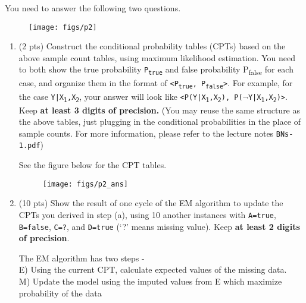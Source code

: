 \documentclass{article}
\newenvironment{soln}{
	\leavevmode\color{blue}\ignorespaces
}{}
\begin{document}
\begin{enumerate}
You need to answer the following two questions.


\begin{figure}[H]
\centering
\texttt{[image: figs/p2]}
\label{fig:q2}
\end{figure}

\begin{enumerate}
\item (2 pts) Construct the conditional probability tables (CPTs) based on the above sample count tables, using maximum likelihood estimation. You need to both show the true probability \texttt{P\textsubscript{true}} and false probability P\textsubscript{false} for each case, and organize them in the format of \texttt{<P\textsubscript{true}, P\textsubscript{false}>}. For example, for the case \texttt{Y|X\textsubscript{1},X\textsubscript{2}}, your answer will look like \texttt{<P(Y|X\textsubscript{1},X\textsubscript{2}), P($\neg$Y|X\textsubscript{1},X\textsubscript{2})>}. Keep \textbf{at least 3 digits of precision.} (You may reuse the same structure as the above tables, just plugging in the conditional probabilities in the place of sample counts. For more information, please refer to the lecture notes \texttt{BNs-1.pdf})

\begin{soln}
See the figure below for the CPT tables.

\begin{figure}[h]
\centering
\texttt{[image: figs/p2\_ans]}
\label{fig:q2_ans}
\end{figure}

\end{soln}



\vspace{10pt}

\item (10 pts) Show the result of one cycle of the EM algorithm to update the CPTs you derived in step (a), using 10 another instances with \texttt{A=true}, \texttt{B=false}, \texttt{C=?}, and \texttt{D=true} (`?' means missing value). Keep \textbf{at least 2 digits of precision}.

\begin{soln}
The EM algorithm has two steps - \\
E) Using the current CPT, calculate expected values of the missing data. \\
M) Update the model using the imputed values from E which maximize probability of the data


\end{soln}
\end{enumerate}
\end{enumerate}
\end{document}
